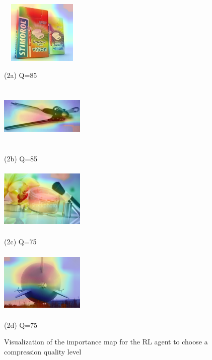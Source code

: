 \begin{figure}[htbp]
    \begin{minipage}{0.2\linewidth}
        \centerline{\includegraphics[width=4.0cm, height=3.0cm]{figures/sensetive_figure1.png}}
        \centerline{(2a) Q=85}
    \end{minipage}
    \hfill
    \begin{minipage}{0.2\linewidth}
        \centerline{\includegraphics[width=4.0cm, height=3.0cm]{figures/sensetive_figure2.png}}
        \centerline{(2b) Q=85}
    \end{minipage}
    \hfill
    \begin{minipage}{0.2\linewidth}
        \centerline{\includegraphics[width=4.0cm, height=3.0cm]{figures/sensetive_figure3.png}}
        \centerline{(2c) Q=75}
    \end{minipage}
    \hfill
    \begin{minipage}{0.2\linewidth}
        \centerline{\includegraphics[width=4.0cm, height=3.0cm]{figures/sensetive_figure4.png}}
        \centerline{(2d) Q=75}
    \end{minipage}
    \vspace{0.2cm}
    \caption{Visualization of the importance map for the RL agent to choose a compression quality level}
    \label{fig: attention}
\end{figure}

